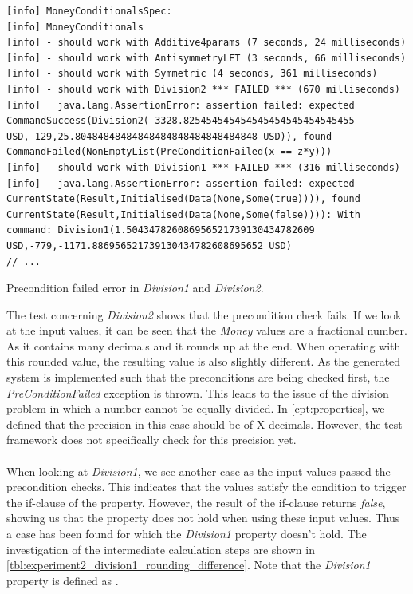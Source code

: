 \FloatBarrier
\begin{sourcecode}[!ht]
\begin{lstlisting}[language=Log]
[info] MoneyConditionalsSpec:
[info] MoneyConditionals
[info] - should work with Additive4params (7 seconds, 24 milliseconds)
[info] - should work with AntisymmetryLET (3 seconds, 66 milliseconds)
[info] - should work with Symmetric (4 seconds, 361 milliseconds)
[info] - should work with Division2 *** FAILED *** (670 milliseconds)
[info]   java.lang.AssertionError: assertion failed: expected CommandSuccess(Division2(-3328.825454545454545454545454545455 USD,-129,25.80484848484848484848484848484848 USD)), found CommandFailed(NonEmptyList(PreConditionFailed(x == z*y)))
[info] - should work with Division1 *** FAILED *** (316 milliseconds)
[info]   java.lang.AssertionError: assertion failed: expected CurrentState(Result,Initialised(Data(None,Some(true)))), found CurrentState(Result,Initialised(Data(None,Some(false)))): With command: Division1(1.504347826086956521739130434782609 USD,-779,-1171.886956521739130434782608695652 USD)
// ...
\end{lstlisting}
\caption{Precondition failed error in \textit{Division1} and \textit{Division2}.}
\label{lst:experiment2_log_second_run}
\end{sourcecode}
\FloatBarrier
The test concerning \textit{Division2} shows that the precondition check fails. If we look at the input values, it can be seen that the \textit{Money} values are a fractional number. As it contains many decimals and it rounds up at the end. When operating with this rounded value, the resulting value is also slightly different. As the generated system is implemented such that the preconditions are being checked first, the \textit{PreConditionFailed} exception is thrown. This leads to the issue of the division problem  in which a number cannot be equally divided. In \autoref{cpt:properties}, we defined that the precision in this case should be of X  decimals. However, the test framework does not specifically check for this precision yet.\\
\\
When looking at \textit{Division1}, we see another case as the input values passed the precondition checks. This indicates that the values satisfy the condition to trigger the if-clause of the property. However, the result of the if-clause returns \textit{false}, showing us that the property does not hold when using these input values. Thus a case has been found for which the \textit{Division1} property doesn't hold. The investigation of the intermediate calculation steps are shown in \autoref{tbl:experiment2_division1_rounding_difference}. Note that the \textit{Division1} property is defined as .

